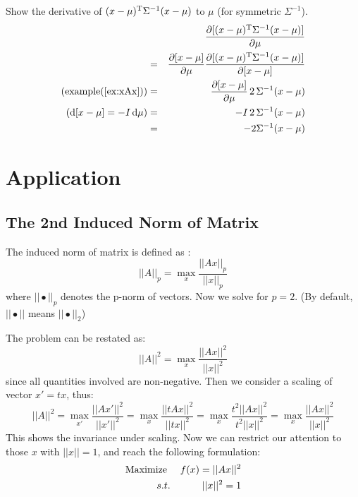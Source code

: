 \begin{myex}
	\label{ex:gaussian_der_mu}
	Show the derivative of $(x-\mu)^\mathrm{T}\Sigma^{-1}(x-\mu)$ to $\mu$
	(for symmetric $\Sigma^{-1}$). 
	\begin{eqnarray}
		&&\dfrac{\partial [(x-\mu)^\mathrm{T}\Sigma^{-1}(x-\mu)]}{\partial \mu}  \\
		&=&\dfrac{\partial [x-\mu]}{\partial \mu}\dfrac{\partial [(x-\mu)^\mathrm{T}\Sigma^{-1}(x-\mu)]}{\partial [x-\mu]} \\
	\text{(example(\ref{ex:xAx}))}	&=&\dfrac{\partial [x-\mu]}{\partial \mu}\,2\,\Sigma^{-1}(x-\mu) \\
	(\mathrm{d}[x-\mu] = -I\, \mathrm{d}\mu)	&=&-I\,2\,\Sigma^{-1}(x-\mu) \\
		&=&-2\Sigma^{-1}(x-\mu)
\end{eqnarray}	 
\end{myex}

\section{Application}
\label{sec:application}

\subsection{The 2nd Induced Norm of Matrix}

The induced norm of matrix is defined as \cite{wiki_norm}:
\begin{equation}
	||A||_p = \max_{x}{\frac{||Ax||_p}{||x||_p}}
\end{equation}
where $||\bullet||_p$ denotes the p-norm of vectors. Now we solve 
for $p=2$. (By default, $||\bullet||$ means $||\bullet||_2$)

The problem can be restated as:
\begin{equation}
	||A||^2 = \max_{x}{\frac{||Ax||^2}{||x||^2}}
\end{equation}
since all quantities involved are non-negative. Then we consider a 
scaling of vector $x' = tx$, thus:
\begin{equation}
	||A||^2 = \max_{x'}{\frac{||Ax'||^2}{||x'||^2}} 
	=\max_{x}{\frac{||tAx||^2}{||tx||^2}}
	=\max_{x}{\frac{t^2||Ax||^2}{t^2||x||^2}}
	=\max_{x}{\frac{||Ax||^2}{||x||^2}}
\end{equation}
This shows the invariance under scaling. Now we can restrict our attention 
to those $x$ with $||x||=1$, and reach the following formulation:
\begin{eqnarray}
	\mathrm{Maximize~} && f(x) = ||Ax||^2 \\
	s.t. && ||x||^2 = 1
\end{eqnarray}

